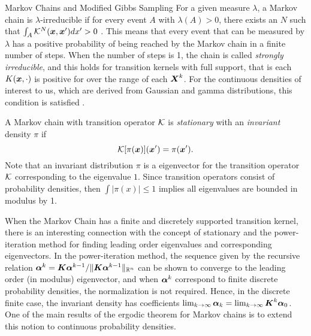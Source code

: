 \begin{chapter}{Markov Chains and Modified Gibbs Sampling}
For a given measure $\lambda$, a Markov chain is $\lambda$-irreducible if for every event $A$ with $\lambda(A) > 0$, there exists an $N$ such that $\int_A \mathcal K^N(\mbox{\boldmath$x$},\mbox{\boldmath$x$}')dx'>0$ \citep{robert2013monte}. 
This means that every event that can be measured by $\lambda$ has a positive probability of being reached by the Markov chain in a finite number of steps.
When the number of steps is 1, the chain is called \emph{strongly irreducible}, and this holds for transition kernels with full support, that is each $K(\mbox{\boldmath$x$},\cdot)$ is positive for over the range of each $\mbox{\boldmath$X$}^k$.
For the continuous densities of interest to us, which are derived from Gaussian and gamma distributions, 
this condition is satisfied \citep{liu2008monte}.

A Markov chain with transition operator $\mathcal K$ is \emph{stationary} with an \emph{invariant} density $\pi$ if 
\begin{equation} \label{eq:stationarity}
  \mathcal K [\pi(\mbox{\boldmath$x$})](\mbox{\boldmath$x$}') = \pi(\mbox{\boldmath$x$}').
\end{equation}
Note that an invariant distribution $\pi$ is a eigenvector for the transition operator $\mathcal K$ corresponding to the eigenvalue $1$.
Since transition operators consist of probability densities, then $\int |\pi(x)| \le 1$ implies all eigenvalues are bounded in modulus by 1.

When the Markov Chain has a finite and discretely supported transition kernel, there is an interesting connection with the concept of stationary and the power-iteration method for finding leading order eigenvalues and corresponding eigenvectors.
In the power-iteration method, the sequence given by the recursive relation $\mbox{\boldmath$\alpha$}^k = \mbox{\boldmath$K$}\mbox{\boldmath$\alpha$}^{k-1}/\|\mbox{\boldmath$K$}\mbox{\boldmath$\alpha$}^{k-1}\|_{\mathbb R^n}$ can be shown to converge to the leading order (in modulus) eigenvector, and when $\mbox{\boldmath$\alpha$}^k$ correspond to finite discrete probability densities, the normalization is not required. 
Hence, in the discrete finite case, the invariant density has coefficients $\lim_{k\to \infty}\mbox{\boldmath$\alpha$}_k = \lim_{k\to \infty} \mbox{\boldmath$K$}^k \mbox{\boldmath$\alpha$}_0$.
One of the main results of the ergodic theorem for Markov chains is to extend this notion to continuous probability densities.


\end{chapter}
